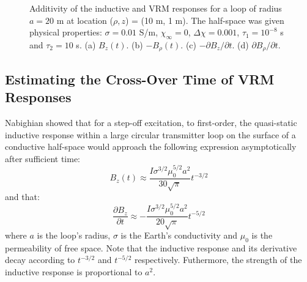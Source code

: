 \documentclass[onecolumn]{IEEEtran} %
\begin{document}
\begin{figure}[!t]
\begin{subfigure}
    \label{figdBrhodtAdditive}
    \end{subfigure}
    \caption{Additivity of the inductive and VRM responses for a loop of radius $a=20$ m at location ($\rho,z$) = (10 m, 1 m). The half-space was given physical properties: $\sigma = 0.01$ S/m, $\chi_{\infty} = 0$, $\Delta \chi = 0.001$, $\tau_1 = 10^{-8}$ s and $\tau_2 = 10$ s. (a) $B_z (t)$. (b) $-B_\rho (t)$. (c) $-\partial B_z/\partial t$. (d) $\partial B_\rho /\partial t$.}
    \label{figVRMrespZadd}
\end{figure}
%


\subsection{Estimating the Cross-Over Time of VRM Responses}
\label{secIndVsVRM}
Nabighian \cite{Nabighian1979} showed that for a step-off excitation, to first-order, the quasi-static inductive response within a large circular transmitter loop on the surface of a conductive half-space would approach the following expression asymptotically after sufficient time:
\begin{equation}
\label{eqKaufmanB}
B_z(t) \approx \frac{I \sigma^{3/2} \mu_0^{5/2} a^2}{30 \sqrt{\pi}} t^{-3/2}
\end{equation}
and that:
\begin{equation}
\label{eqKaufmandBdt}
\frac{\partial B_z}{\partial t} \approx -\frac{ I \sigma^{3/2} \mu_0^{5/2} a^2}{20 \sqrt{\pi}} t^{-5/2}
\end{equation}
where $a$ is the loop's radius, $\sigma$ is the Earth's conductivity and $\mu_0$ is the permeability of free space. Note that the inductive response and its derivative decay according to $t^{-3/2}$ and $t^{-5/2}$ respectively. Futhermore, the strength of the inductive response is proportional to $a^2$.
\end{document}
